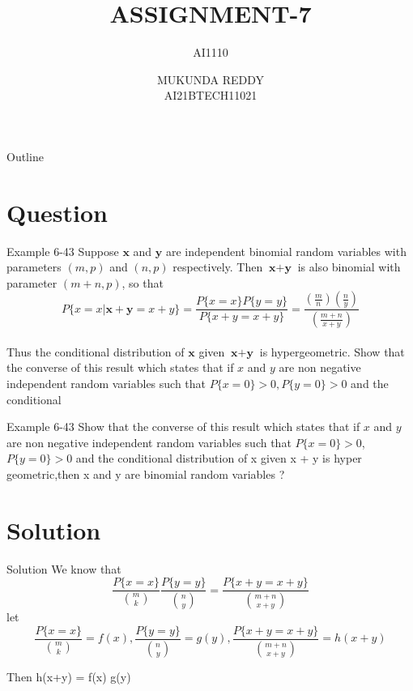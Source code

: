 \documentclass{beamer}
\title[AI1110  Assignment-7]{ASSIGNMENT-7}
\subtitle{AI1110}
\author[]{MUKUNDA REDDY \\ AI21BTECH11021}
\date{}
\begin{document}
  \begin{frame}
      \titlepage
  \end{frame}
  
  \begin{frame}{Outline}
      \tableofcontents
  \end{frame}
  
  \section{Question}
  \begin{frame}{Example 6-43}
  Suppose $\textbf{x}$ and $\textbf{y}$ are independent binomial random variables
  with parameters $(m, p)$ and $(n, p)$ respectively. Then $\textbf{x} + \textbf{y}$ is also binomial with parameter $(m + n, p)$, so that \\
  $$ P\{x=x|\textbf{x}+\textbf{y}=x+y\} = \frac{P\{x=x\}P\{y=y\}}{P\{x+y=x+y\}} = \frac{(\frac{m}{n})(\frac{n}{y})}{(\frac{m+n}{x+y})}  $$ \\
  Thus the conditional distribution of $\textbf{x}$ given $\textbf{x} + \textbf{y}$ is
  hypergeometric. Show that the converse of this result which states that if $x$ and $y$ are non negative independent random
  variables such that $P\{x=0\}>0,P\{y=0\}>0$ and the conditional
  \end{frame}
  
  \begin{frame}{Example 6-43}
  Show that the converse of this result which states that if
   $x$ and $y$ are non negative independent random
   variables such that $P\{x=0\}>0$,$P\{ y=0\}>0$ and the conditional
   distribution of x given x + y is hyper geometric,then x and y are binomial random variables ?
  \end{frame}
  
  \section{Solution}
  \begin{frame}{Solution}
      We know that
      $$\frac{P \{ x= x \} }{{m \choose k}} \frac{P \{ y=y \} }{{n \choose y} }= \frac{P\{x+y=x+y\}}{{{m+n}\choose{x+y}}}$$
      let 
      $$\frac{P \{ x= x \} }{{m \choose k}} = f(x),\frac{P \{ y=y \} }{{n \choose y}} = g(y),\frac{P\{x+y=x+y\}}{ {{m+n} \choose {x+y}}} = h(x+y)$$
      \begin{center}
      Then h(x+y) = f(x) \times g(y)
      \end{center}
  \end{frame}
  
\end{document}
